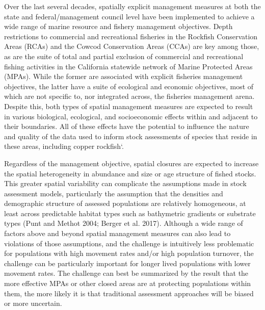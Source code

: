 \documentclass[11pt,
  english,
  letterpaper,
]{article}
\begin{document}
Over the last several decades, spatially explicit management measures at both the state and federal/management council level have been implemented to achieve a wide range of marine resource and fishery management objectives. Depth restrictions to commercial and recreational fisheries in the Rockfish Conservation Areas (RCAs) and the Cowcod Conservation Areas (CCAs) are key among those, as are the suite of total and partial exclusion of commercial and recreational fishing activities in the California statewide network of Marine Protected Areas (MPAs). While the former are associated with explicit fisheries management objectives, the latter have a suite of ecological and economic objectives, most of which are not specific to, nor integrated across, the fisheries management arena. Despite this, both types of spatial management measures are expected to result in various biological, ecological, and socioeconomic effects within and adjacent to their boundaries. All of these effects have the potential to influence the nature and quality of the data used to inform stock assessments of species that reside in these areas, including copper rockfish`.

Regardless of the management objective, spatial closures are expected to increase the spatial heterogeneity in abundance and size or age structure of fished stocks. This greater spatial variability can complicate the assumptions made in stock assessment models, particularly the assumption that the densities and demographic structure of assessed populations are relatively homogeneous, at least across predictable habitat types such as bathymetric gradients or substrate types (Punt and Methot 2004; Berger et al. 2017). Although a wide range of factors above and beyond spatial management measures can also lead to violations of those assumptions, and the challenge is intuitively less problematic for populations with high movement rates and/or high population turnover, the challenge can be particularly important for longer lived populations with lower movement rates. The challenge can best be summarized by the result that the more effective MPAs or other closed areas are at protecting populations within them, the more likely it is that traditional assessment approaches will be biased or more uncertain.
\end{document}
